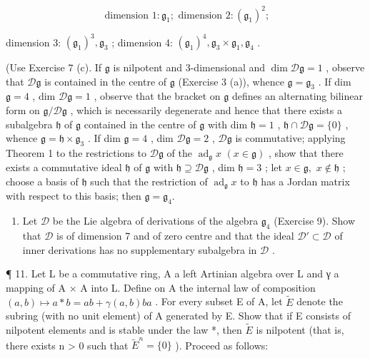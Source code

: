 \[
\text { dimension } 1: \mathfrak {g} _ {1}; \text { dimension } 2: (\mathfrak {g} _ {1}) ^ {2};
\]

dimension 3: \((\mathfrak{g}_1)^3, \mathfrak{g}_3\) ; dimension 4: \((\mathfrak{g}_1)^4, \mathfrak{g}_3 \times \mathfrak{g}_1, \mathfrak{g}_4\) .

(Use Exercise 7 (c). If \(\mathfrak{g}\) is nilpotent and 3-dimensional and \(\dim \mathcal{D}\mathfrak{g} = 1\) , observe that \(\mathcal{D}\mathfrak{g}\) is contained in the centre of \(\mathfrak{g}\) (Exercise 3 (a)), whence \(\mathfrak{g} = \mathfrak{g}_3\) . If dim \(\mathfrak{g} = 4\) , dim \(\mathcal{D}\mathfrak{g} = 1\) , observe that the bracket on \(\mathfrak{g}\) defines an alternating bilinear form on \(\mathfrak{g} / \mathcal{D}\mathfrak{g}\) , which is necessarily degenerate and hence that there exists a subalgebra \(\mathfrak{h}\) of \(\mathfrak{g}\) contained in the centre of \(\mathfrak{g}\) with dim \(\mathfrak{h} = 1\) , \(\mathfrak{h}\cap \mathcal{D}\mathfrak{g} = \{0\}\) , whence \(\mathfrak{g} = \mathfrak{h}\times \mathfrak{g}_3\) . If dim \(\mathfrak{g} = 4\) , dim \(\mathcal{D}\mathfrak{g} = 2\) , \(\mathcal{D}\mathfrak{g}\) is commutative; applying Theorem 1 to the restrictions to \(\mathcal{D}\mathfrak{g}\) of the \(\operatorname{ad}_{\mathfrak{g}} x\) \((x\in \mathfrak{g})\) , show that there exists a commutative ideal \(\mathfrak{h}\) of \(\mathfrak{g}\) with \(\mathfrak{h}\supseteq \mathcal{D}\mathfrak{g}\) , dim \(\mathfrak{h} = 3\) ; let \(x\in \mathfrak{g},\) \(x\notin \mathfrak{h}\) ; choose a basis of \(\mathfrak{h}\) such that the restriction of \(\operatorname{ad}_{\mathfrak{g}}x\) to \(\mathfrak{h}\) has a Jordan matrix with respect to this basis; then \(\mathfrak{g} = \mathfrak{g}_4\).

\begin{enumerate}
\def\labelenumi{\arabic{enumi}.}
\setcounter{enumi}{9}
\tightlist
\item
  Let \(\mathcal{D}\) be the Lie algebra of derivations of the algebra \(\mathfrak{g}_4\) (Exercise 9). Show that \(\mathcal{D}\) is of dimension 7 and of zero centre and that the ideal \(\mathcal{D}' \subset \mathcal{D}\) of inner derivations has no supplementary subalgebra in \(\mathcal{D}\) .
\end{enumerate}

¶ 11. Let L be a commutative ring, A a left Artinian algebra over L and γ a mapping of A × A into L. Define on A the internal law of composition \((a, b) \mapsto a * b = ab + \gamma(a, b)ba\) . For every subset E of A, let \(\tilde{E}\) denote the subring (with no unit element) of A generated by E. Show that if E consists of nilpotent elements and is stable under the law *, then \(\tilde{E}\) is nilpotent (that is, there exists n \textgreater{} 0 such that \(\tilde{E}^{n} = \{0\}\) ). Proceed as follows:

